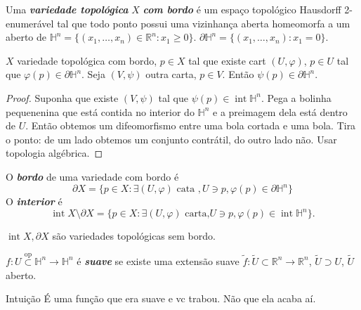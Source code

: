 \begin{defn}\leavevmode
Uma \textit{\textbf{variedade topológica}} \(X\) \textit{\textbf{com bordo}} é um espaço topológico Hausdorff 2-enumerável tal que todo ponto possui uma vizinhança aberta homeomorfa a um aberto de \(\mathbb{H}^n=\{(x_1,\ldots,x_n) \in \mathbb{R}^n :x_1 \geq 0\}\). \(\partial \mathbb{H}^n=\{(x_1,\ldots,x_n):x_1=0\}\).
\end{defn}

\begin{prop}\leavevmode
\(X\) variedade topológica com bordo, \(p \in X\) tal que existe cart \((U,\varphi)\), \(p \in U\) tal que \(\varphi(p) \in \partial \mathbb{H}^n\). Seja \((V,\psi)\) outra carta, \(p \in V\). Então \(\psi(p) \in \partial \mathbb{H}^n\).
\end{prop}

\begin{proof}\leavevmode
Suponha que existe \((V,\psi)\) tal que \(\psi(p) \in \operatorname{in t}\mathbb{H}^n\). Pega a bolinha pequenenina que está contida no interior do \(\mathbb{H}^n\) e a preimagem dela está dentro de \(U\). Então obtemos um difeomorfismo entre uma bola cortada e uma bola. Tira o ponto: de um lado obtemos um conjunto contrátil, do outro lado não. Usar topologia algébrica.
\end{proof}

\begin{defn}\leavevmode
O \textit{\textbf{bordo}} de uma variedade com bordo é
\[\partial X=\{ p \in X : \exists (U,\varphi)\text{ cata } , U \ni p, \varphi(p) \in \partial \mathbb{H}^n\}\]
O \textit{\textbf{interior}} é
\[\operatorname{ in t }X \setminus \partial X=\{ p \in X: \exists  (U, \varphi) \text{ carta,} U \ni p, \varphi(p) \in \operatorname{in t}\mathbb{H}^n\}.\]
\end{defn}

\begin{remark}\leavevmode
\(\operatorname{ in t}X, \partial X\) são variedades topológicas sem bordo.
\end{remark}

\begin{defn}\leavevmode
\(f: U \overset{\text{op} }{\subset} \mathbb{H}^n \to \mathbb{H}^n\)  é \textit{\textbf{suave}} se existe uma extensão suave \(\tilde{f}: \tilde{U} \subset \mathbb{R}^n \to \mathbb{R}^n\), \(\tilde{U} \supset U\), \(\tilde{U}\) aberto.
\end{defn}

\begin{thing4}{Intuição}\leavevmode
É uma função que era suave e vc trabou. Não que ela acaba aí.
\end{thing4}

